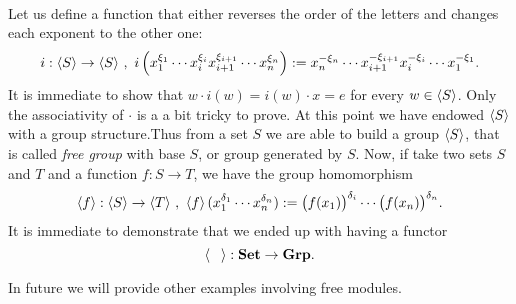 \begin{example}
\[\begin{aligned}
  \end{aligned}\]
Let us define a function that either reverses the order of the letters and changes each exponent to the other one:
\[i : \left\langle S\right\rangle \to \left\langle S\right\rangle \,, \ i\left( x_1^{\xi_1} \cdots{}
    x_i^{\xi_i} x_{i+1}^{\xi_{i+1}} \cdots{} x_n^{\xi_n} \right) :=
  x_n^{-\xi_n} \cdots{} x_{i+1}^{-\xi_{i+1}} x_i^{-\xi_i} \cdots{}
  x_1^{-\xi_1} .\] It is immediate to show that
\(w \cdot i(w) = i(w) \cdot x = e\) for every \(w \in \left\langle S\right\rangle\). Only the associativity of \(\cdot\) is a a bit tricky to
prove. At this point we have endowed \(\left\langle S\right\rangle\) with a group
structure.\newline Thus from a set \(S\) we are able to build a group
\(\left\langle S\right\rangle\), that is called {\em free group} with base \(S\), or
group generated by \(S\). Now, if take two sets \(S\) and \(T\) and a
function \(f : S \to T\), we have the group homomorphism
\[\left\langle f\right\rangle : \left\langle S\right\rangle \to \left\langle T\right\rangle \,, \ \left\langle f\right\rangle (x_1^{\delta_1}
  \cdots{} x_n^{\delta_n}) := \big(f(x_1)\big)^{\delta_i} \cdots{}
  \big(f(x_n)\big)^{\delta_n} .\] It is immediate to demonstrate that
we ended up with having a functor
\[\angled{\phantom\square} : \Set \to \Grp .\]
\end{example}

In future we will provide other examples involving free modules.


